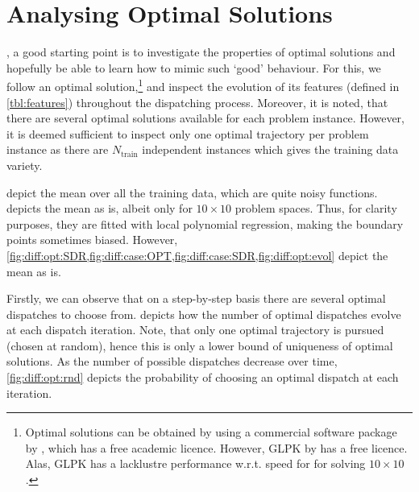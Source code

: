 
\chapter{Analysing Optimal Solutions}\label{ch:analysingopt} 
, a good starting point is 
to investigate the properties of optimal solutions and hopefully be able to 
learn how to mimic such `good' behaviour. 
For this, we follow an optimal solution,\footnote{Optimal solutions can be 
  obtained by using a commercial software package by \citet{gurobi}, which has 
  a free academic licence. However, GLPK by \citet{glpk} has a free licence. 
  Alas, GLPK has a lacklustre performance w.r.t. speed for for solving 
  $10\times10$ \JSP.}
and inspect the evolution of its features  (defined in \cref{tbl:features}) 
throughout the dispatching process. 
Moreover, it is noted, that there are several optimal solutions available for 
each problem instance. However, it is deemed sufficient to inspect only one 
optimal trajectory per problem instance as there are $N_{\text{train}}$ 
independent instances which gives the training data variety. 

depict the mean over all the training data, which are quite noisy 
functions.  depicts the mean as is, albeit only for 
$10\times10$ problem spaces. 
Thus, for clarity purposes, they are fitted with local polynomial regression, 
making the boundary points sometimes biased. 
However, 
\cref{fig:diff:opt:SDR,fig:diff:case:OPT,fig:diff:case:SDR,fig:diff:opt:evol} 
depict the mean as is.






Firstly, we can observe that on a step-by-step basis there are several optimal 
dispatches to choose from.  depicts how the number of 
optimal dispatches evolve at each dispatch iteration. Note, that only one 
optimal trajectory is pursued (chosen at random), hence this is only a lower 
bound of uniqueness of optimal solutions.
As the number of possible dispatches decrease over time, 
\cref{fig:diff:opt:rnd} 
depicts the probability of choosing an optimal dispatch at each iteration. 

